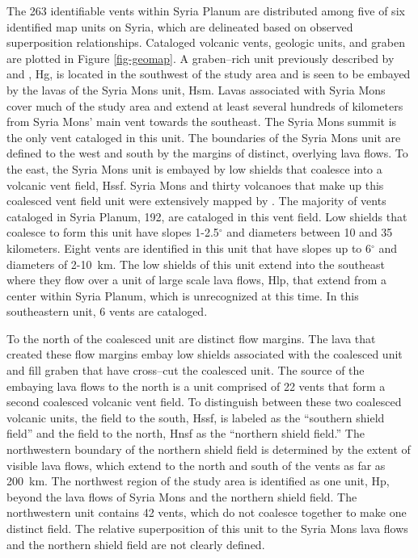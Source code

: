 The 263 identifiable vents within Syria Planum are distributed among five of six identified map units on Syria, which are delineated based on observed superposition relationships. Cataloged volcanic vents, geologic units, and graben are plotted in Figure \ref{fig-geomap}. A graben--rich unit previously described by \citet{Baptista2008} and \citet{Tanaka1988}, Hg, is located in the southwest of the study area and is seen to be embayed by the lavas of the Syria Mons unit, Hsm. Lavas associated with Syria Mons cover much of the study area and extend at least several hundreds of kilometers from Syria Mons' main vent towards the southeast. The Syria Mons summit is the only vent cataloged in this unit. The boundaries of the Syria Mons unit are defined to the west and south by the margins of distinct, overlying lava flows. To the east, the Syria Mons unit is embayed by low shields that coalesce into a volcanic vent field, Hssf. Syria Mons and thirty volcanoes that make up this coalesced vent field unit were extensively mapped by \citet{Baptista2008}. The majority of vents cataloged in Syria Planum, 192, are cataloged in this vent field. Low shields that coalesce to form this unit have slopes 1-2.5$^{\circ}$ and diameters between 10 and 35 kilometers. Eight vents are identified in this unit that have slopes up to 6$^{\circ}$ and diameters of 2-10~km. The low shields of this unit extend into the southeast where they flow over a unit of large scale lava flows, Hlp, that extend from a center within Syria Planum, which is unrecognized at this time. In this southeastern unit, 6 vents are cataloged.

To the north of the coalesced unit are distinct flow margins. The lava that created these flow margins embay low shields associated with the coalesced unit and fill graben that have cross--cut the coalesced unit. The source of the embaying lava flows to the north is a unit comprised of 22 vents that form a second coalesced volcanic vent field. To distinguish between these two coalesced volcanic units, the field to the south, Hssf, is labeled as the ``southern shield field'' and the field to the north, Hnsf as the ``northern shield field.'' The northwestern boundary of the northern shield field is determined by the extent of visible lava flows, which extend to the north and south of the vents as far as 200~km. The northwest region of the study area is identified as one unit, Hp, beyond the lava flows of Syria Mons and the northern shield field. The northwestern unit contains 42 vents, which do not coalesce together to make one distinct field. The relative superposition of this unit to the Syria Mons lava flows and the northern shield field are not clearly defined.

